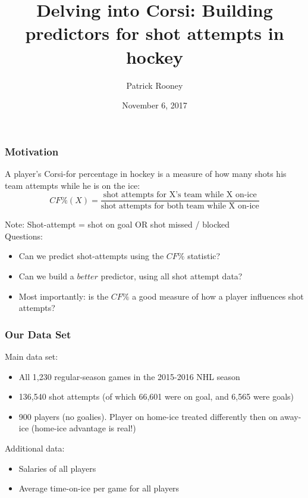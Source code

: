 \documentclass{beamer}
\title{Delving into Corsi: Building predictors for shot attempts in hockey}
\author{Patrick Rooney}
\date{November 6, 2017}
\begin{document}
\begin{frame}
        \titlepage
\end{frame}

\begin{frame}
        \frametitle{Motivation}
	A player's Corsi-for percentage in hockey is a measure of how many shots his team attempts while he is on the ice: \\
	\[ CF\% ( X) = \frac{\text{shot attempts for X's team while X on-ice}}{\text{shot attempts for both team while X on-ice}} \]

	\vspace{0.1in}
	Note: Shot-attempt = shot on goal OR shot missed / blocked \\
	
	
	\vspace{0.1in}
	Questions: 
	\begin{itemize}
	\item Can we predict shot-attempts using the $CF\%$ statistic?
	\item Can we build a $better$ predictor, using all shot attempt data?
	\item Most importantly: is the $CF\%$ a good measure of how a player influences shot attempts?
	\end{itemize} 
        
\end{frame}



\begin{frame}
          \frametitle{Our Data Set }

Main data set:
	\begin{itemize}
	\item All 1,230 regular-season games in the 2015-2016 NHL season
	\item 136,540 shot attempts (of which 66,601 were on goal, and 6,565 were goals)
	\item 900 players (no goalies). Player on home-ice treated differently then on away-ice (home-ice advantage is real!)
	\end{itemize} 
Additional data:
	\begin{itemize}
	\item Salaries of all players
	\item Average time-on-ice per game for all players
	\end{itemize} 


\end{frame}
\end{document}
